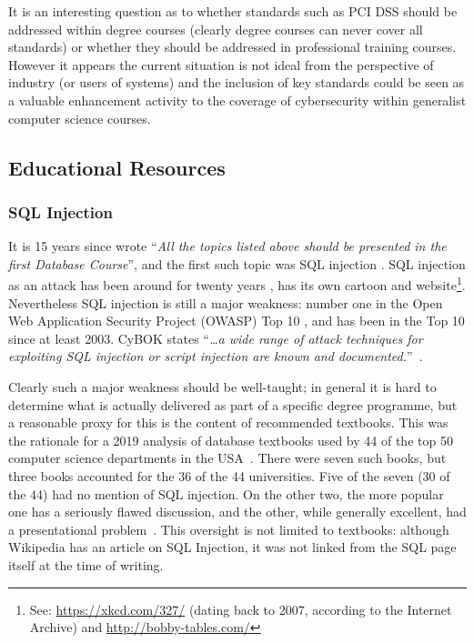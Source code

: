 \documentclass[conference]{IEEEtran}
\begin{document}
It is an interesting question as to whether standards such as PCI DSS should be addressed within degree courses (clearly degree courses can never cover all standards) or whether they should be addressed in professional training courses. However it appears the current situation is not ideal from the perspective of industry (or users of systems) and the inclusion of key standards could be seen as a valuable enhancement activity to the coverage of cybersecurity within generalist computer science courses.

\subsection{Educational Resources}\label{sec:EDResource}

\subsubsection{SQL Injection}\label{sec:SQL}

It is 15 years since \cite{Guimaraesetal2004} wrote ``{\emph{All the topics listed above should be presented in the first Database Course}}'', and the first such topic was SQL injection \cite{SPIDynamics2002,Anonymous2018b}. SQL injection as an attack has been around for twenty years \cite{HornerHyslip2017a}, has its own cartoon and website\footnote{See: \url{https://xkcd.com/327/} (dating back to 2007, according to the Internet Archive) and \url{http://bobby-tables.com/}}. Nevertheless SQL injection is still a major weakness: number one in the Open Web Application Security Project (OWASP) Top 10 \cite{OWASP2017a}, and has been in the Top 10 since at least 2003. CyBOK states ``{\emph{\ldots a wide range of attack techniques for exploiting SQL injection or script injection are known and documented.}}''~\cite{Bristol2018a}.

Clearly such a major weakness should be well-taught; in general it is hard to determine what is actually delivered as part of a specific degree programme, but a reasonable proxy for this is the content of recommended textbooks. This was the rationale for a 2019 analysis of database textbooks used by 44 of the top 50 computer science departments in the USA~\cite{Drop2019}.  There were seven such books, but three books accounted for the 36 of the 44 universities. Five of the seven (30 of the 44) had no mention of SQL injection. On the other two, the more popular one has a seriously flawed discussion, and the other, while generally excellent, had a presentational problem~\cite{Drop2019}. This oversight is not limited to textbooks: although Wikipedia has an article on SQL Injection, it was not linked from the SQL page itself at the time of writing.
\end{document}

